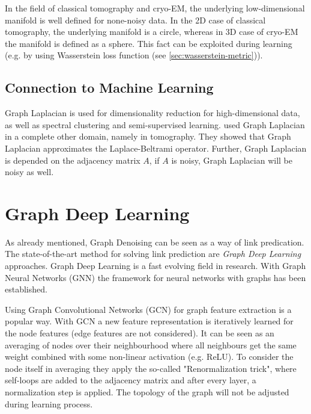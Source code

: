\begin{tcolorbox}[colback=red!5!white,colframe=red!75!black]
    In the field of classical tomography and cryo-EM, the underlying low-dimensional manifold is well defined for none-noisy data.
    In the 2D case of classical tomography, the underlying manifold is a circle, whereas in 3D case of cryo-EM the manifold
    is defined as a sphere.
    This fact can be exploited during learning (e.g. by using Wasserstein loss function (see \ref{sec:wasserstein-metric})).
\end{tcolorbox}

\subsection{Connection to Machine Learning}

Graph Laplacian is used for dimensionality reduction for high-dimensional data, as well as spectral clustering and semi-supervised learning.
\citet{LaplaceRandomProjections} used Graph Laplacian in a complete other domain, namely in tomography. 
They showed that Graph Laplacian approximates the Laplace-Beltrami operator.
Further, Graph Laplacian is depended on the adjacency matrix $A$, if $A$ is noisy, Graph Laplacian will be noisy as well.

\section{Graph Deep Learning}
\label{sec:graph_depp_learning}
As already mentioned, Graph Denoising can be seen as a way of link predication. 
The state-of-the-art method for solving link prediction are \textit{Graph Deep Learning} approaches.
Graph Deep Learning is a fast evolving field in research. With Graph Neural Networks (GNN) \cite{GNN} the framework
for neural networks with graphs has been established. 

Using Graph Convolutional Networks (GCN) \cite{GCN} for graph feature extraction is a popular way. 
With GCN a new feature representation is iteratively learned for the node features (edge features are not considered).
It can be seen as an averaging of nodes over their neighbourhood where all neighbours get the same weight combined with some non-linear activation (e.g. ReLU). 
To consider the node itself in averaging they apply the so-called "Renormalization trick", where self-loops are added to the 
adjacency matrix and after every layer, a normalization step is applied. 
The topology of the graph will not be adjusted during  learning process.

